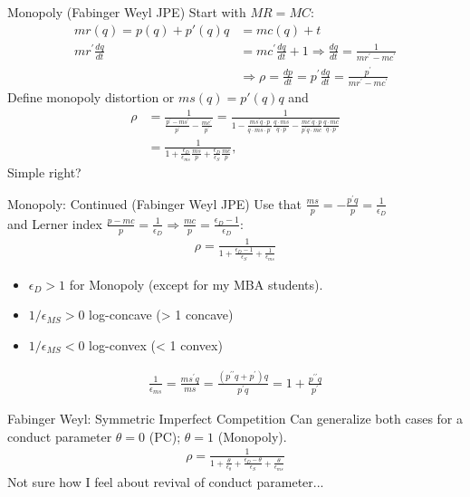 \documentclass[aspectratio=169,10pt]{beamer}
\begin{document}
\begin{frame}{Monopoly (Fabinger Weyl JPE)}
Start with $MR = MC$:
\begin{align*}
mr(q) = p(q) + p'(q) q &= mc(q) + t\\
m r^{\prime} \frac{d q}{d t} & =m c^{\prime} \frac{d q}{d t}+1 \Rightarrow \frac{d q}{d t}=\frac{1}{m r^{\prime}-m c^{\prime}} \\
& \Rightarrow \rho=\frac{d p}{d t}=p^{\prime} \frac{d q}{d t}=\frac{p^{\prime}}{m r^{\prime}-m c^{\prime}}
\end{align*}
Define monopoly distortion or $ms(q) = p'(q) q$ and
\begin{align*}
\rho & =\frac{1}{\frac{p^{\prime}-m s^{\prime}}{p^{\prime}}-\frac{m c^{\prime}}{p^{\prime}}}=\frac{1}{1-\frac{m s^{\prime} q \cdot p}{q \cdot m s \cdot p^{\prime}} \frac{q \cdot m s}{q \cdot p}-\frac{m c^{\prime} q \cdot p}{p^{\prime} q \cdot m c} \frac{q \cdot m c}{q \cdot p}} \\
& =\frac{1}{1+\frac{\epsilon_D}{\epsilon_{m s}} \frac{m s}{p}+\frac{\epsilon_D}{\epsilon_S} \frac{m c}{p}},
\end{align*}
Simple right?
\end{frame}


\begin{frame}{Monopoly: Continued (Fabinger Weyl JPE)}
Use that $\frac{m s}{p}=-\frac{p^{\prime} q}{p}=\frac{1}{\epsilon_D}$\\
 and Lerner index $\frac{p-m c}{p}=\frac{1}{\epsilon_D} \Rightarrow \frac{m c}{p}=\frac{\epsilon_D-1}{\epsilon_D}$:
\begin{align*}
\rho=\frac{1}{1+\frac{\epsilon_D-1}{\epsilon_S}+\frac{1}{\epsilon_{m s}}}
\end{align*}
\begin{itemize}
\item $\epsilon_D >1$ for Monopoly (except for my MBA students).
\item $1/\epsilon_{MS} >0$ log-concave (> 1 concave)
\item $1/\epsilon_{MS} <0$ log-convex  (< 1 convex)
\end{itemize}
\begin{align*}
\frac{1}{\epsilon_{m s}}=\frac{m s^{\prime} q}{m s}=\frac{\left(p^{\prime \prime} q+p^{\prime}\right) q}{p^{\prime} q}=1+\frac{p^{\prime \prime} q}{p^{\prime}}
\end{align*}
\end{frame}

\begin{frame}{Fabinger Weyl: Symmetric Imperfect Competition}
Can generalize both cases for a conduct parameter $\theta=0$ (PC); $\theta=1$ (Monopoly).
\begin{align*}
\rho=\frac{1}{1+\frac{\theta}{\epsilon_\theta}+\frac{\epsilon_D-\theta}{\epsilon_S}+\frac{\theta}{\epsilon_{m s}}}
\end{align*}
Not sure how I feel about revival of conduct parameter...
\end{frame}
\end{document}
